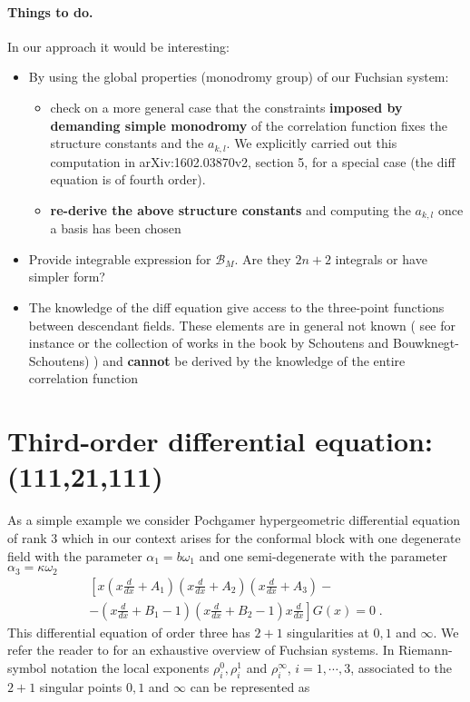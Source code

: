 \documentclass[12pt,a4paper]{article}
\newcommand{\< }{{\langle}}
\renewcommand{\>}{{\rangle}}
\newcommand{\cB}{\mathcal{B}}
\newcommand{\0}{\textbf{0.}}
\newcommand{\1}{\textbf{1.}}
\newcommand{\2}{\textbf{2.}}
\newcommand{\3}{\textbf{3.}}
\newcommand{\4}{\textbf{4.}}
\newcommand{\5}{\textbf{5.}}
\newcommand{\6}{\textbf{6.}}
\newcommand{\7}{\textbf{7.}}
\newcommand{\8}{\textbf{8.}}
\newcommand{\9}{\textbf{9.}}
\begin{document}
\paragraph{Things to do.}
In our approach it would be interesting:
\begin{itemize}
\item By using the global properties (monodromy group) of our Fuchsian system:
\begin{itemize}
\item check on a more general case that the constraints {\bf imposed by demanding simple monodromy} of the correlation function fixes the structure constants and the $a_{k,l}$. We explicitly carried out this computation in arXiv:1602.03870v2, section 5, for a special case (the diff equation is of fourth order).

\item  {\bf re-derive the above structure constants} and  computing the $a_{k,l}$ once a basis has been chosen 
\end{itemize}

\item Provide integrable expression for $\cB_{M}$. Are they $2 n+2$ integrals or have simpler form?
 
\item The knowledge of the diff equation give access to the three-point functions between descendant fields. These elements are in general not known ( see for instance \cite{Bouwknegt:1992wg} or the collection of works in the book by Schoutens and Bouwknegt-Schoutens) ) and {\bf cannot} be derived by the knowledge of the entire correlation function
\end{itemize}




\section{Third-order differential equation: (111,21,111)}

As a simple example we consider Pochgamer hypergeometric differential equation of rank 3 which in our context arises for
the conformal block with one degenerate field with the parameter $\alpha_1=b\omega_1$ and one 
semi-degenerate with the parameter $\alpha_3= \kappa \omega_2$
\begin{multline}\label{Pochgamer}
  \left[x\left(x\frac{d}{dx}+A_1\right)
  \left(x\frac{d}{dx}+A_2\right)
  \left(x\frac{d}{dx}+A_3\right)-\right.\\-\left.
  \left(x\frac{d}{dx}+B_1-1\right)
  \left(x\frac{d}{dx}+B_2-1\right)x\frac{d}{dx}\right]G(x)=0\;.
\end{multline}
This differential equation of order three has $2+1$ singularities at $0, 1$ and $\infty$. We refer the reader to \cite{yoshida1987fuchsian} for an exhaustive overview of 
Fuchsian systems. In Riemann-symbol notation
the local exponents $\rho^{0}_i,\rho^{1}_i$ and $\rho^{\infty}_i$, $i=1,\cdots,3$, associated to the $2+1$ singular points $0,1$ and $\infty$ can be represented as
\end{document}
